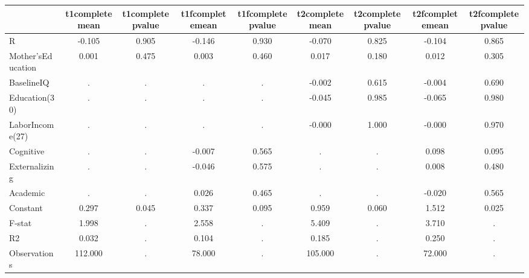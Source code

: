 \begin{table}[htbp]
\begin{tabular}{lcccccccc} \hline \hline
 & t1completemean  & t1completepvalue  & t1fcompletemean  & t1fcompletepvalue  & t2completemean  & t2completepvalue  & t2fcompletemean  & t2fcompletepvalue  \\  \hline 
R &    -0.105 &     0.905 &    -0.146 &     0.930 &    -0.070 &     0.825 &    -0.104 &     0.865 \\  
Mother'sEducation &     0.001 &     0.475 &     0.003 &     0.460 &     0.017 &     0.180 &     0.012 &     0.305 \\  
BaselineIQ &         . &         . &         . &         . &    -0.002 &     0.615 &    -0.004 &     0.690 \\  
Education(30) &         . &         . &         . &         . &    -0.045 &     0.985 &    -0.065 &     0.980 \\  
LaborIncome(27) &         . &         . &         . &         . &    -0.000 &     1.000 &    -0.000 &     0.970 \\  
Cognitive &         . &         . &    -0.007 &     0.565 &         . &         . &     0.098 &     0.095 \\  
Externalizing &         . &         . &    -0.046 &     0.575 &         . &         . &     0.008 &     0.480 \\  
Academic &         . &         . &     0.026 &     0.465 &         . &         . &    -0.020 &     0.565 \\  
Constant &     0.297 &     0.045 &     0.337 &     0.095 &     0.959 &     0.060 &     1.512 &     0.025 \\  
F-stat &     1.998 &         . &     2.558 &         . &     5.409 &         . &     3.710 &         . \\  
R2 &     0.032 &         . &     0.104 &         . &     0.185 &         . &     0.250 &         . \\  
Observations &   112.000 &         . &    78.000 &         . &   105.000 &         . &    72.000 &         . \\  
\hline \hline \end{tabular}
\end{table}
